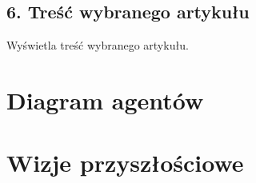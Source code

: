 \documentclass[a4paper,11pt]{report}
\begin{document}
\subsection{6. Treść wybranego artykułu}
Wyświetla treść wybranego artykułu.

\section{Diagram agentów}

\section{Wizje przyszłościowe}
\end{document}
